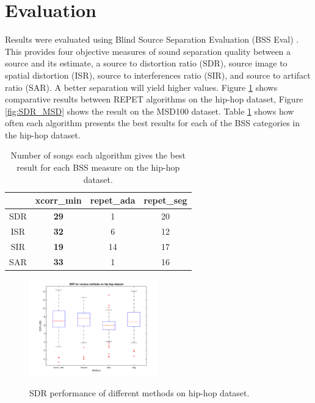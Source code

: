 \documentclass{article}
\begin{document}
\section{Evaluation}


Results were evaluated using Blind Source Separation Evaluation (BSS Eval) \cite{BSS}. This provides four objective measures of sound separation quality between a source and its estimate, a source to distortion ratio (SDR), source image to spatial distortion (ISR), source to interferences ratio (SIR), and source to artifact ratio (SAR). A better separation will yield higher values. Figure \ref{fig:SDR_hip_hop} shows comparative results between REPET algorithms on the hip-hop dataset, Figure \ref{fig:SDR_MSD} shows the result on the MSD100 dataset. Table \ref{tab:percentBest_hip_hop} shows how often each algorithm presents the best results for each of the BSS categories in the hip-hop dataset.

  \begin{table}[h]
  \caption{Number of songs each algorithm gives the best result for each BSS measure on the hip-hop dataset.}
  \label{tab:percentBest_hip_hop}
  \begin{center}
  \begin{tabular}{@{} cccc @{}}
    \hline
    & xcorr\_min & repet\_ada & repet\_seg \\ 
    \hline
    SDR & \textbf{29} & 1 & 20 \\ 
    ISR & \textbf{32} & 6 & 12 \\ 
    SIR & \textbf{19} & 14 & 17 \\ 
    SAR & \textbf{33} & 1 & 16\\
    \hline
  \end{tabular}
      \end{center}
    \end{table}

\begin{figure}[h]
	\caption{SDR performance of different methods on hip-hop dataset.}
	\includegraphics[width=0.5\textwidth]{figs/allSDR_inc_neural_hip_hop_new.png}
	\label{fig:SDR_hip_hop}
\end{figure}
\end{document}
